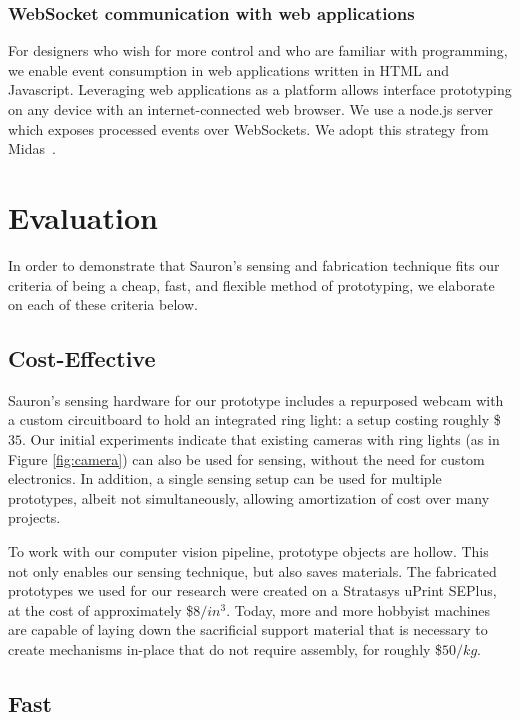 \subsubsection{WebSocket communication with web applications}

For designers who wish for more control and who are familiar with programming, we enable event consumption in web applications written in HTML and Javascript. Leveraging web applications as a platform allows interface prototyping on any device with an internet-connected web browser. 
We use a node.js server which exposes processed events over WebSockets. We adopt this strategy from Midas~\cite{savage-midas}. 

\section{Evaluation}

In order to demonstrate that Sauron's sensing and fabrication technique fits our criteria of being a cheap, fast, and flexible method of prototyping, we elaborate on each of these criteria below.

    \subsection{Cost-Effective}
    
    Sauron's sensing hardware for our prototype includes a repurposed webcam with a custom circuitboard to hold an integrated ring light: a setup costing roughly \$$35$. Our initial experiments indicate that existing cameras with ring lights (as in Figure \ref{fig:camera}) can also be used for sensing, without the need for custom electronics. In addition, a single sensing setup can be used for multiple prototypes, albeit not simultaneously, allowing amortization of cost over many projects.
    
    To work with our computer vision pipeline, prototype objects are hollow. This not only enables our sensing technique, but also saves materials. The fabricated prototypes we used for our research were created on a Stratasys uPrint SEPlus, at the cost of approximately \$$8/in^3$. Today, more and more hobbyist machines are capable of laying down the sacrificial support material that is necessary to create mechanisms in-place that do not require assembly, for roughly \$$50/kg$.
    
    \subsection{Fast}
    
